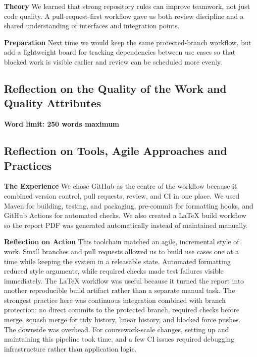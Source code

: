 \documentclass[11pt,a4paper]{article}
\begin{document}
\textbf{Theory}
We learned that strong repository rules can improve teamwork, not just code quality. A pull-request-first workflow gave us both review discipline and a shared understanding of interfaces and integration points.

\textbf{Preparation}
Next time we would keep the same protected-branch workflow, but add a lightweight board for tracking dependencies between use cases so that blocked work is visible earlier and review can be scheduled more evenly.

\subsection{Reflection on the Quality of the Work and Quality Attributes}

\noindent
\textbf{Word limit: 250 words maximum}

\vspace{10em}

\subsection{Reflection on Tools, Agile Approaches and Practices}

\noindent
\textbf{The Experience}
We chose GitHub as the centre of the workflow because it combined version control, pull requests, review, and CI in one place. We used Maven for building, testing, and packaging, pre-commit for formatting hooks, and GitHub Actions for automated checks. We also created a LaTeX build workflow so the report PDF was generated automatically instead of maintained manually.

\textbf{Reflection on Action}
This toolchain matched an agile, incremental style of work. Small branches and pull requests allowed us to build use cases one at a time while keeping the system in a releasable state. Automated formatting reduced style arguments, while required checks made test failures visible immediately. The LaTeX workflow was useful because it turned the report into another reproducible build artifact rather than a separate manual task. The strongest practice here was continuous integration combined with branch protection: no direct commits to the protected branch, required checks before merge, squash merge for tidy history, linear history, and blocked force pushes. The downside was overhead. For coursework-scale changes, setting up and maintaining this pipeline took time, and a few CI issues required debugging infrastructure rather than application logic.
\end{document}
